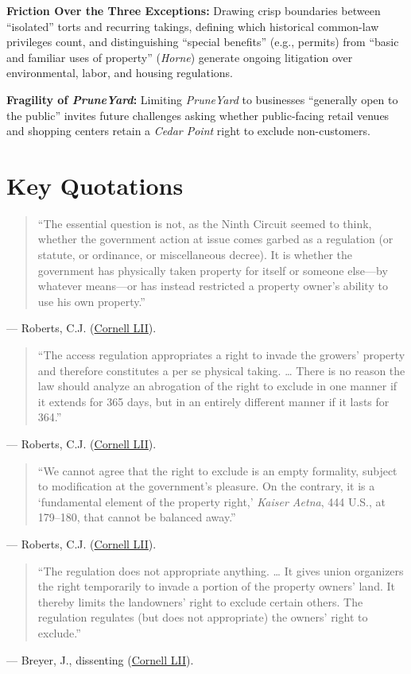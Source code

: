 \documentclass[12pt]{article}
\begin{document}
\textbf{Friction Over the Three Exceptions:} Drawing crisp boundaries between ``isolated'' torts and recurring takings, defining which historical common-law privileges count, and distinguishing ``special benefits'' (e.g., permits) from ``basic and familiar uses of property'' (\textit{Horne}) generate ongoing litigation over environmental, labor, and housing regulations.

\textbf{Fragility of \textit{PruneYard}:} Limiting \textit{PruneYard} to businesses ``generally open to the public'' invites future challenges asking whether public-facing retail venues and shopping centers retain a \textit{Cedar Point} right to exclude non-customers.

\section{Key Quotations}
\begin{quote}
``The essential question is not, as the Ninth Circuit seemed to think, whether the government action at issue comes garbed as a regulation (or statute, or ordinance, or miscellaneous decree). It is whether the government has physically taken property for itself or someone else---by whatever means---or has instead restricted a property owner's ability to use his own property.''
\end{quote}
\noindent --- Roberts, C.J. (\href{https://www.law.cornell.edu/supremecourt/text/20-107}{Cornell LII}).

\begin{quote}
``The access regulation appropriates a right to invade the growers' property and therefore constitutes a per se physical taking. \ldots{} There is no reason the law should analyze an abrogation of the right to exclude in one manner if it extends for 365 days, but in an entirely different manner if it lasts for 364.''
\end{quote}
\noindent --- Roberts, C.J. (\href{https://www.law.cornell.edu/supremecourt/text/20-107}{Cornell LII}).

\begin{quote}
``We cannot agree that the right to exclude is an empty formality, subject to modification at the government's pleasure. On the contrary, it is a `fundamental element of the property right,' \textit{Kaiser Aetna}, 444 U.S., at 179--180, that cannot be balanced away.''
\end{quote}
\noindent --- Roberts, C.J. (\href{https://www.law.cornell.edu/supremecourt/text/20-107}{Cornell LII}).

\begin{quote}
``The regulation does not appropriate anything. \ldots{} It gives union organizers the right temporarily to invade a portion of the property owners' land. It thereby limits the landowners' right to exclude certain others. The regulation regulates (but does not appropriate) the owners' right to exclude.''
\end{quote}
\noindent --- Breyer, J., dissenting (\href{https://www.law.cornell.edu/supremecourt/text/20-107}{Cornell LII}).
\end{document}

